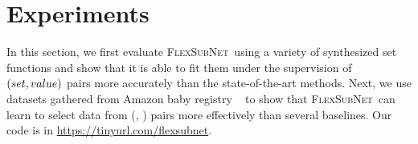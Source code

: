 \documentclass{article}
\newcommand{\our}{\textsc{Flex\-Sub\-Net}}
\renewcommand{\cite}{\citep}
\begin{document}
% 

\section{Experiments}
\label{sec:expt}
In this section, we first evaluate \our\  using a variety of synthesized set functions and show that it is able to fit them under the supervision of $({set},{value})$ pairs more accurately than the state-of-the-art methods.
Next, we use datasets gathered from Amazon baby registry ~\cite{gillenwater2014expectation} to show that \our\ can
learn to select data from  (\tuniv, \thigh) pairs more effectively than several baselines. Our code is in \href{https://tinyurl.com/flexsubnet}{https://tinyurl.com/flexsubnet}.

\end{document}
